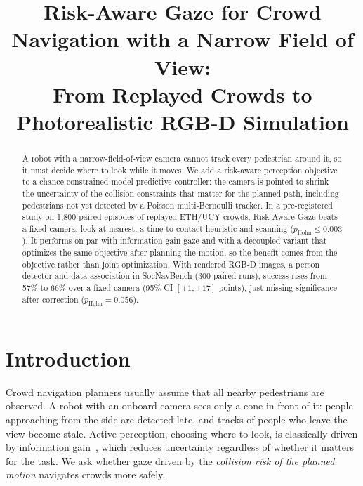 \documentclass[conference]{IEEEtran}
\begin{document}
\title{Risk-Aware Gaze for Crowd Navigation with a Narrow Field of View:\\
From Replayed Crowds to Photorealistic RGB-D Simulation}

\author{
}

\maketitle

\begin{abstract}
A robot with a narrow-field-of-view camera cannot track every pedestrian around it, so it must decide where to look while it moves. We add a risk-aware perception objective to a chance-constrained model predictive controller: the camera is pointed to shrink the uncertainty of the collision constraints that matter for the planned path, including pedestrians not yet detected by a Poisson multi-Bernoulli tracker. In a pre-registered study on 1,800 paired episodes of replayed ETH/UCY crowds, Risk-Aware Gaze beats a fixed camera, look-at-nearest, a time-to-contact heuristic and scanning ($p_\text{Holm}\le0.003$). It performs on par with information-gain gaze and with a decoupled variant that optimizes the same objective after planning the motion, so the benefit comes from the objective rather than joint optimization. With rendered RGB-D images, a person detector and data association in SocNavBench (300 paired runs), success rises from 57\% to 66\% over a fixed camera (95\% CI $[+1, +17]$ points), just missing significance after correction ($p_\text{Holm}=0.056$).
\end{abstract}

\section{Introduction}
Crowd navigation planners usually assume that all nearby pedestrians are observed. A robot with an onboard camera sees only a cone in front of it: people approaching from the side are detected late, and tracks of people who leave the view become stale. Active perception, choosing where to look, is classically driven by information gain~\cite{bajcsy1988}, which reduces uncertainty regardless of whether it matters for the task. We ask whether gaze driven by the \emph{collision risk of the planned motion} navigates crowds more safely.
\end{document}
